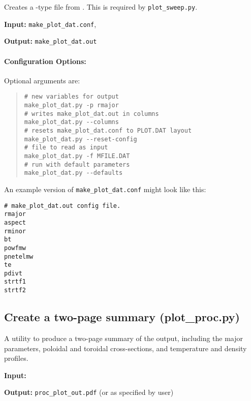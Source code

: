 Creates a \plotdat-type file from \mfile.  This is required by \texttt{plot\_sweep.py}.

\begin{description}
\item{\textbf{Input:}}
\verb|make_plot_dat.conf|, \mfile\

\item{\textbf{Output:}}
\verb|make_plot_dat.out|
\end{description}

\paragraph{Configuration Options:}

Optional arguments are:
\begin{quote}
\begin{verbatim}
# new variables for output
make_plot_dat.py -p rmajor
# writes make_plot_dat.out in columns
make_plot_dat.py --columns
# resets make_plot_dat.conf to PLOT.DAT layout
make_plot_dat.py --reset-config
# file to read as input
make_plot_dat.py -f MFILE.DAT
# run with default parameters
make_plot_dat.py --defaults
\end{verbatim}
\end{quote}

An example version of \texttt{make\_plot\_dat.conf} might look like this:
\begin{framed}
\begin{verbatim}
# make_plot_dat.out config file.
rmajor
aspect
rminor
bt
powfmw
pnetelmw
te
pdivt
strtf1
strtf2
\end{verbatim}
\end{framed}

\subsection{Create a two-page summary (plot\_proc.py)}

A utility to produce a two-page summary of the output, including the major
parameters, poloidal and toroidal cross-sections, and temperature and density profiles.

\begin{description}
\item{\textbf{Input:}}
 \mfile

\item{\textbf{Output:}}
\verb|proc_plot_out.pdf| (or as specified by user)
\end{description}

